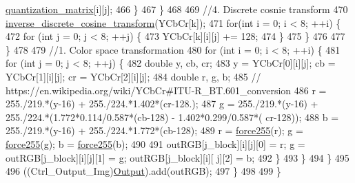 \begin{DoxyCode}
      \hyperlink{classdomini_1_1algorithm_1_1JPEG_a7c95eb140dbe185a31b402d48ec17a66}{quantization\_matrix}[i][j];
466                         \}
467                     \}
468 
469                     \textcolor{comment}{//4. Discrete cosnie transform}
470                     \hyperlink{classdomini_1_1algorithm_1_1JPEG_a3a6e16b0ee34746e4b0118ed9107bd75}{inverse\_discrete\_cosine\_transform}(YCbCr[k]);
471                     \textcolor{keywordflow}{for}(\textcolor{keywordtype}{int} i = 0; i < 8; ++i) \{
472                         \textcolor{keywordflow}{for} (\textcolor{keywordtype}{int} j = 0; j < 8; ++j) \{
473                             YCbCr[k][i][j] += 128;
474                         \}
475                     \}
476 
477                 \}
478 
479                 \textcolor{comment}{//1. Color space transformation}
480                 \textcolor{keywordflow}{for} (\textcolor{keywordtype}{int} i = 0; i < 8; ++i) \{
481                     \textcolor{keywordflow}{for} (\textcolor{keywordtype}{int} j = 0; j < 8; ++j) \{
482                         \textcolor{keywordtype}{double} y, cb, cr;
483                         y = YCbCr[0][i][j]; cb = YCbCr[1][i][j]; cr = YCbCr[2][i][j];
484                         \textcolor{keywordtype}{double} r, g, b;
485                         \textcolor{comment}{// https://en.wikipedia.org/wiki/YCbCr#ITU-R\_BT.601\_conversion}
486                         r = 255./219.*(y-16) + 255./224.*1.402*(cr-128.);
487                         g = 255./219.*(y-16) + 255./224.*(1.772*0.114/0.587*(cb-128) - 1.402*0.299/0.587*(
      cr-128));
488                         b = 255./219.*(y-16) + 255./224.*1.772*(cb-128);
489                         r = \hyperlink{classdomini_1_1algorithm_1_1JPEG_af86bdbb6b6f5671abff6bc6bd5f6349d}{force255}(r); g = \hyperlink{classdomini_1_1algorithm_1_1JPEG_af86bdbb6b6f5671abff6bc6bd5f6349d}{force255}(g); b = 
      \hyperlink{classdomini_1_1algorithm_1_1JPEG_af86bdbb6b6f5671abff6bc6bd5f6349d}{force255}(b);
490                         
491                         outRGB[j\_block][i][j][0] = r; g = outRGB[j\_block][i][j][1] = g; outRGB[j\_block][i][
      j][2] = b;
492                     \}
493                 \}
494             \}
495 
496             ((Ctrl\_Output\_Img)\hyperlink{classdomini_1_1algorithm_1_1Algorithm_a4de9955411c656325adc391ef570c082}{Output}).add(outRGB);
497         \}
498 
499     \}
\end{DoxyCode}
\mbox{\label{classdomini_1_1algorithm_1_1JPEG_a367e6d1e6543bf3d8c847aae36f4b6bf}} 
